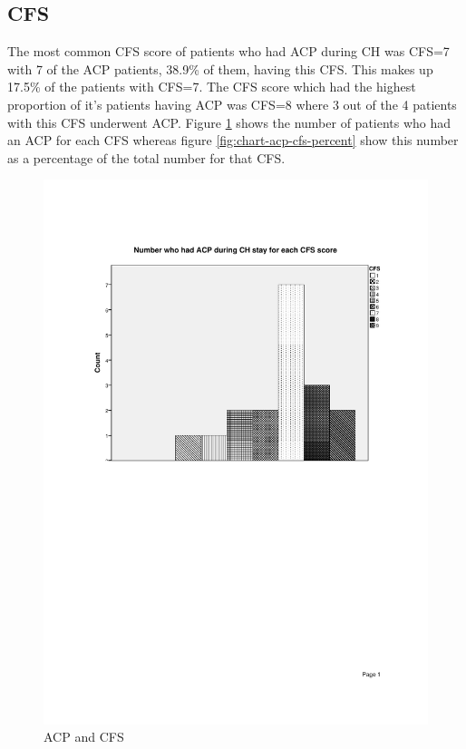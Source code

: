 \documentclass
[
	12pt,
	a4paper,
	oneside,
]{report}
\begin{document}
\subsection{CFS}

The most common CFS score of patients 
who had ACP during CH was CFS=7 with 7 of the ACP patients, 38.9\% of them, 
having this CFS. 
This makes up 17.5\% of the patients with CFS=7. 
The CFS score which had the highest 
proportion of it's patients having ACP was CFS=8 where 3 out of the 4 patients 
with this CFS underwent ACP. Figure \ref{fig:chart-acp-cfs} shows the number of 
patients who 
had an ACP for each CFS whereas figure \ref{fig:chart-acp-cfs-percent} show this 
number as a percentage of the total number for that CFS.


\begin{figure}[ht]
\caption{ACP and CFS}
\label{fig:chart-acp-cfs}
\includegraphics[width=\textwidth,
	trim={2.5cm 14cm 2.5cm 2.5cm},
	clip]{media/graph-cfs-acp-count}
\end{figure}
\end{document}
